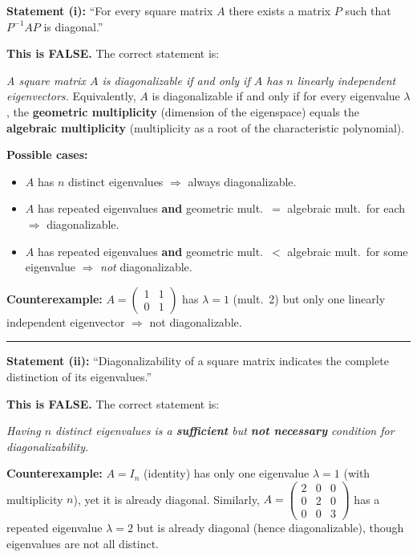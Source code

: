 \documentclass[12pt,a3paper]{article}
\begin{document}
\begin{tcolorbox}[enhanced,breakable,
  colback=cE!4,colframe=cE,boxrule=0.8pt,arc=5pt,
  title={\textbf{Answer --- Rectification of Statements on Diagonalizability}},
  fonttitle=\bfseries\color{white},colbacktitle=cE]

\textbf{Statement (i):} ``For every square matrix $A$ there exists a matrix $P$ such
that $P^{-1}AP$ is diagonal.''

\medskip
\textbf{This is FALSE.} The correct statement is:

\textit{A square matrix $A$ is diagonalizable if and only if $A$ has $n$ linearly
independent eigenvectors.}  Equivalently, $A$ is diagonalizable if and only if
for every eigenvalue $\lambda$, the \textbf{geometric multiplicity} (dimension of
the eigenspace) equals the \textbf{algebraic multiplicity} (multiplicity as a root
of the characteristic polynomial).

\textbf{Possible cases:}
\begin{itemize}[itemsep=2pt]
  \item $A$ has $n$ distinct eigenvalues $\Rightarrow$ always diagonalizable.
  \item $A$ has repeated eigenvalues \textbf{and} geometric mult.\ $=$ algebraic mult.\
        for each $\Rightarrow$ diagonalizable.
  \item $A$ has repeated eigenvalues \textbf{and} geometric mult.\ $<$ algebraic mult.\
        for some eigenvalue $\Rightarrow$ \emph{not} diagonalizable.
\end{itemize}

\textbf{Counterexample:} $A=\begin{pmatrix}1&1\\0&1\end{pmatrix}$ has $\lambda=1$
(mult.\ 2) but only one linearly independent eigenvector $\Rightarrow$ not diagonalizable.

\medskip\textcolor{cE}{\rule{\textwidth}{0.4pt}}

\textbf{Statement (ii):} ``Diagonalizability of a square matrix indicates the complete
distinction of its eigenvalues.''

\medskip
\textbf{This is FALSE.} The correct statement is:

\textit{Having $n$ distinct eigenvalues is a \textbf{sufficient} but \textbf{not necessary}
condition for diagonalizability.}

\textbf{Counterexample:} $A=I_n$ (identity) has only one eigenvalue $\lambda=1$
(with multiplicity $n$), yet it is already diagonal. Similarly,
$A=\begin{pmatrix}2&0&0\\0&2&0\\0&0&3\end{pmatrix}$ has a repeated eigenvalue $\lambda=2$
but is already diagonal (hence diagonalizable), though eigenvalues are not all distinct.

\end{tcolorbox}
\end{document}
